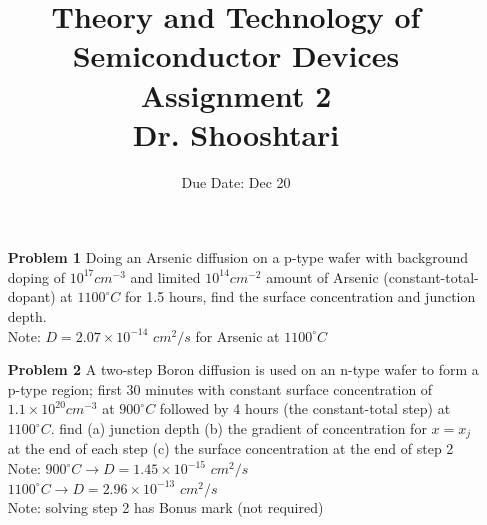 \documentclass{report}
\title{Theory and Technology of Semiconductor Devices\\ Assignment 2 \\ \vspace{30pt} Dr. Shooshtari}
\author{}
\date{Due Date: Dec 20}
\begin{document}
	\maketitle
	
	\begin{enumerate}
		\item[\bf{Problem 1}] Doing an Arsenic diffusion on a p-type wafer with background doping of $10^{17} cm^{-3}$ and limited $10^{14} cm^{-2}$ amount of Arsenic (constant-total-dopant) at $1100^{\circ} C$ for 1.5 hours, find the surface concentration and junction depth. \\
		Note: $D=2.07\times 10^{-14}$ $cm^2/s$ for Arsenic at $1100^{\circ} C$
		
		\item[\bf{Problem 2}] A two-step Boron diffusion is used on an n-type wafer to form a p-type region; first 30 minutes with constant surface concentration of $1.1\times 10^{20} cm^{-3}$ at $900^{\circ} C$ followed by 4 hours (the constant-total step) at $1100^{\circ} C$. find (a) junction depth (b) the gradient of concentration for $x=x_j$ at the end of each step (c) the surface concentration at the end of step 2\\
		Note: $900^{\circ} C \rightarrow D = 1.45\times 10^{-15}$ $cm^{2}/s$ \\
		$1100^{\circ} C \rightarrow D = 2.96\times 10^{-13}$ $cm^{2}/s$ \\
		Note: solving step 2 has Bonus mark (not required)
	\end{enumerate}
\end{document}
